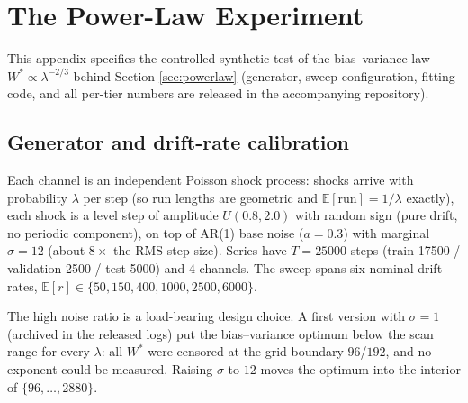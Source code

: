\section{The Power-Law Experiment}
\label{app:powerlaw}

This appendix specifies the controlled synthetic test of the bias--variance law $W^* \propto \lambda^{-2/3}$ behind Section \ref{sec:powerlaw} (generator, sweep configuration, fitting code, and all per-tier numbers are released in the accompanying repository).

\subsection{Generator and drift-rate calibration}

Each channel is an independent Poisson shock process: shocks arrive with probability $\lambda$ per step (so run lengths are geometric and $\mathbb{E}[\text{run}] = 1/\lambda$ exactly), each shock is a level step of amplitude $U(0.8, 2.0)$ with random sign (pure drift, no periodic component), on top of AR(1) base noise ($a{=}0.3$) with marginal $\sigma = 12$ (about $8\times$ the RMS step size). Series have $T{=}25000$ steps (train 17500 / validation 2500 / test 5000) and 4 channels. The sweep spans six nominal drift rates, $\mathbb{E}[r] \in \{50, 150, 400, 1000, 2500, 6000\}$.

The high noise ratio is a load-bearing design choice. A first version with $\sigma{=}1$ (archived in the released logs) put the bias--variance optimum below the scan range for every $\lambda$: all $W^*$ were censored at the grid boundary $96$/$192$, and no exponent could be measured. Raising $\sigma$ to $12$ moves the optimum into the interior of $\{96, \dots, 2880\}$.

